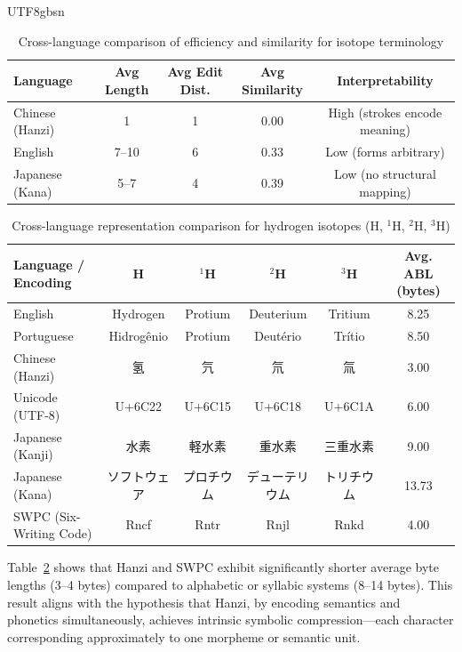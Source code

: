 \documentclass[conference]{IEEEtran}
\begin{document}
\begin{CJK*}{UTF8}{gbsn}
\begin{table}[h!]
\centering
\caption{Cross-language comparison of efficiency and similarity for isotope terminology}
\label{tab:language_comparison}
\begin{tabular}{lcccc}
\hline
\textbf{Language} & \textbf{Avg Length} & \textbf{Avg Edit Dist.} & \textbf{Avg Similarity} & \textbf{Interpretability} \\
\hline
Chinese (Hanzi) & 1 & 1 & 0.00 & High (strokes encode meaning) \\
English & 7--10 & 6 & 0.33 & Low (forms arbitrary) \\
Japanese (Kana) & 5--7 & 4 & 0.39 & Low (no structural mapping) \\
\hline
\end{tabular}
\end{table}

\begin{table}[htbp]
\centering
\caption{Cross-language representation comparison for hydrogen isotopes (H, $^{1}$H, $^{2}$H, $^{3}$H)}
\label{tab:isotope_comparison}
\footnotesize
\renewcommand{\arraystretch}{1.2}
\begin{tabular}{lccccc}
\toprule
\textbf{Language / Encoding} & \textbf{H} & \textbf{$^{1}$H} & \textbf{$^{2}$H} & \textbf{$^{3}$H} & \textbf{Avg. ABL (bytes)} \\
\midrule
English & Hydrogen & Protium & Deuterium & Tritium & 8.25 \\
Portuguese & Hidrogênio & Protium & Deutério & Trítio & 8.50 \\
Chinese (Hanzi) & 氢 & 氕 & 氘 & 氚 & 3.00 \\
Unicode (UTF-8) & U+6C22 & U+6C15 & U+6C18 & U+6C1A & 6.00 \\
Japanese (Kanji) & 水素 & 軽水素 & 重水素 & 三重水素 & 9.00 \\
Japanese (Kana) & ソフトウェア & プロチウム & デューテリウム & トリチウム & 13.73 \\
SWPC (Six-Writing Code) & Rncf & Rntr & Rnjl & Rnkd & 4.00 \\
\bottomrule
\end{tabular}
\end{table}



Table~\ref{tab:isotope_comparison} shows that Hanzi and SWPC exhibit significantly shorter average byte lengths (3–4 bytes) compared to alphabetic or syllabic systems (8–14 bytes).  
This result aligns with the hypothesis that Hanzi, by encoding semantics and phonetics simultaneously, achieves intrinsic symbolic compression—each character corresponding approximately to one morpheme or semantic unit.


\end{CJK*}
\end{document}
